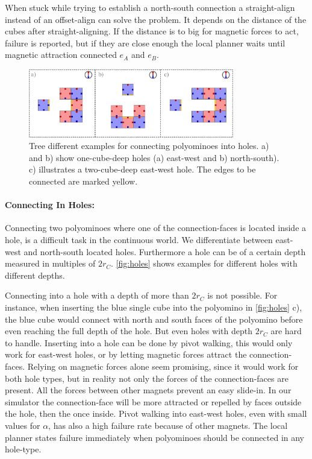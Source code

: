 When stuck while trying to establish a north-south connection a straight-align instead of an offset-align can solve the problem.
It depends on the distance of the cubes after straight-aligning.
If the distance is to big for magnetic forces to act, failure is reported, but if they are close enough the local planner waits until magnetic attraction connected $e_A$ and $e_B$.


\begin{figure}
	\centering
	\includegraphics[width=0.80\textwidth]{figures/holes.pdf}
	\caption{Tree different examples for connecting polyominoes into holes. a) and b) show one-cube-deep holes (a) east-west and b) north-south). c) illustrates a two-cube-deep east-west hole. The edges to be connected are marked yellow.}
	\label{fig:holes}
\end{figure}

\paragraph{Connecting In Holes:}

Connecting two polyominoes where one of the connection-faces is located inside a hole, is a difficult task in the continuous world.
We differentiate between east-west and north-south located holes.
Furthermore a hole can be of a certain depth measured in multiples of $2 r_C$.
\autoref{fig:holes} shows examples for different holes with different depths.

Connecting into a hole with a depth of more than $2 r_C$ is not possible.
For instance, when inserting the blue single cube into the polyomino in \autoref{fig:holes} c), the blue cube would connect with north and south faces of the polyomino before even reaching the full depth of the hole.
But even holes with depth $2 r_C$ are hard to handle.
Inserting into a hole can be done by pivot walking, this would only work for east-west holes, or by letting magnetic forces attract the connection-faces.
Relying on magnetic forces alone seem promising, since it would work for both hole types, but in reality not only the forces of the connection-faces are present.
All the forces between other magnets prevent an easy slide-in.
In our simulator the connection-face will be more attracted or repelled by faces outside the hole, then the once inside.
Pivot walking into east-west holes, even with small values for $\alpha$, has also a high failure rate because of other magnets.
The local planner states failure immediately when polyominoes should be connected in any hole-type.

